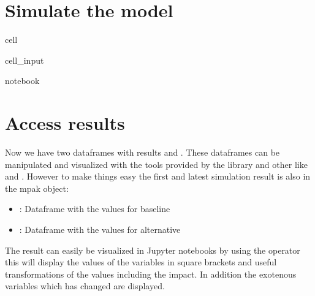 \documentclass[letterpaper,10pt,english]{jupyterBook}
\begin{document}
\section{Simulate the model}
\label{\detokenize{content/06_WBModels/LoadingWBModel:simulate-the-model}}
\begin{sphinxuseclass}{cell}\begin{sphinxVerbatimInput}

\begin{sphinxuseclass}{cell_input}
\begin{sphinxVerbatim}[commandchars=\\\{\}]
 notebook 
   
\end{sphinxVerbatim}

\end{sphinxuseclass}\end{sphinxVerbatimInput}

\end{sphinxuseclass}

\section{Access results}
\label{\detokenize{content/06_WBModels/LoadingWBModel:access-results}}
\sphinxAtStartPar
Now we have two dataframes with results  and . These dataframes can be manipulated and visualized
with the tools provided by the  library and other like  and . However to make things easy the first and
latest simulation result is also in the mpak object:
\begin{itemize}
\item {} 
\sphinxAtStartPar
{}: Dataframe with the values for baseline

\item {} 
\sphinxAtStartPar
{}: Dataframe with the values for alternative

\end{itemize}

\sphinxAtStartPar
The result can easily be visualized in Jupyter notebooks by using the \sphinxcode{\sphinxupquote{{[}.{]}}} operator this will display the values of the variables in square brackets and useful
transformations of the values including the impact. In addition the exotenous variables which has changed are displayed.
\end{document}
